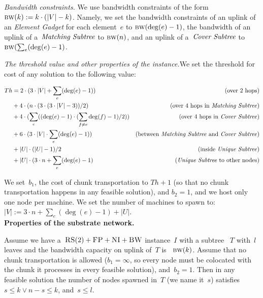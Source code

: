 \documentclass[preprint,12pt]{elsarticle}
\newcommand{\CC}{\textsc{NI}}
\newcommand{\FP}{\textsc{FP}}
\newcommand{\RS}{\textsc{RS}}
\newcommand{\BW}{\textsc{BW}}
\newcommand{\numNodes}{\ensuremath{|V|}}
\newcommand{\UnqSubtree}{{{\emph{Unique Subtree}}}}
\newcommand{\MatchSubtree}{{\emph{Matching Subtree}}}
\newcommand{\CoverSubtree}{{\emph{Cover Subtree}}}
\newcommand{\ElGadget}{{\emph{Element Gadget}}}
\newcommand{\Band}{\textsc{bw}}
\newcommand{\CostTrans}{\ensuremath{b_1}}
\newcommand{\CostCom}{\ensuremath{b_2}}
\newcommand{\Thr}{\ensuremath{Th}}
\begin{document}
\emph{Bandwidth constraints.}
We use bandwidth constraints of the form
$\Band(k) := k\cdot(\numNodes - k)$. Namely, we set the bandwidth
constraints of an uplink of an {\ElGadget} for each element~$e$ to 
$\Band(\deg(e)-1)$, the bandwidth of an uplink of a~$\MatchSubtree$ to 
$\Band(n)$, and an uplink of a~$\CoverSubtree$ to 
$\Band(\sum_e (\deg(e)-1)$.

\emph{The threshold value and other properties of the instance.}We set the
threshold for cost of any solution to the following value:

\begin{tiny}
\begin{align*}
  \Thr  & = 2\cdot (3\cdot \numNodes + \sum_e (\deg(e) - 1)) & \mbox{(over 2 hops)}\\
        & + 4\cdot (n\cdot (3 \cdot (3\cdot \numNodes - 3)) / 2) & \mbox{(over 4 hops in {\MatchSubtree})}\\
        & + 4\cdot (\sum_e((\deg(e) - 1)\cdot (\sum_{f\neq e} \deg(f) - 1)/2)) & \mbox{(over 4 hops in {\CoverSubtree})}\\
        & + 6\cdot (3\cdot \numNodes \cdot \sum_e(\deg(e) - 1)) & \mbox{(between {\MatchSubtree} and {\CoverSubtree})} \\
        & + |U|\cdot (|U|-1)/2 & \mbox{(inside {\UnqSubtree})} \\
        & + |U| \cdot (3\cdot n + \sum_e (\deg(e)-1) & \mbox{({\UnqSubtree} to other nodes)} \\
\end{align*}
\end{tiny}

  We
set~$\CostTrans$, the cost of chunk transportation to $\Thr+1$ (so that no chunk transportation happens in any feasible solution), and
$\CostCom = 1$, and we host only one node per machine. We set the
number of machines to spawn to:
$\numNodes := 3\cdot n + \sum_e (\deg(e)-1) + |U|$.
\\

\noindent \textbf{Properties of the substrate network.}
\begin{lemma}
  Assume we have a~$\RS(2)+\FP+\CC+\BW$ instance~$I$ with a subtree
 ~$T$ with~$l$ leaves and the bandwidth capacity on uplink of~$T$ is
 ~$\Band(k)$. Assume that no chunk transportation is allowed
  ($\CostTrans = \infty$, so every node must be colocated with the
  chunk it processes in every feasible solution), and~$\CostCom = 1$.
  Then in any feasible solution the number of nodes spawned in~$T$ (we
  name it~$s$) satisfies~$s \leq k \vee n-s\leq k$, and~$s \leq l$.
  \label{lem:bandwidth1}
\end{lemma}
\end{document}
